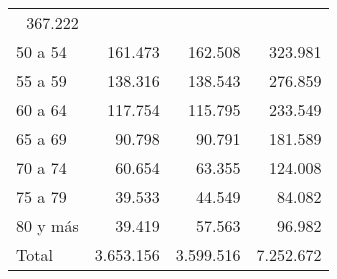 \begin{tabular}{llll}
  \multicolumn{1}{r}{367.222} \\
\multicolumn{1}{l}{\hspace{1em}50 a 54} &
  \multicolumn{1}{|r}{161.473} &
  \multicolumn{1}{r}{162.508} &
  \multicolumn{1}{r}{323.981} \\
\multicolumn{1}{l}{\hspace{1em}55 a 59} &
  \multicolumn{1}{|r}{138.316} &
  \multicolumn{1}{r}{138.543} &
  \multicolumn{1}{r}{276.859} \\
\multicolumn{1}{l}{\hspace{1em}60 a 64} &
  \multicolumn{1}{|r}{117.754} &
  \multicolumn{1}{r}{115.795} &
  \multicolumn{1}{r}{233.549} \\
\multicolumn{1}{l}{\hspace{1em}65 a 69} &
  \multicolumn{1}{|r}{90.798} &
  \multicolumn{1}{r}{90.791} &
  \multicolumn{1}{r}{181.589} \\
\multicolumn{1}{l}{\hspace{1em}70 a 74} &
  \multicolumn{1}{|r}{60.654} &
  \multicolumn{1}{r}{63.355} &
  \multicolumn{1}{r}{124.008} \\
\multicolumn{1}{l}{\hspace{1em}75 a 79} &
  \multicolumn{1}{|r}{39.533} &
  \multicolumn{1}{r}{44.549} &
  \multicolumn{1}{r}{84.082} \\
\multicolumn{1}{l}{\hspace{1em}80 y más} &
  \multicolumn{1}{|r}{39.419} &
  \multicolumn{1}{r}{57.563} &
  \multicolumn{1}{r}{96.982} \\
\multicolumn{1}{l}{\hspace{1em}Total} &
  \multicolumn{1}{|r}{3.653.156} &
  \multicolumn{1}{r}{3.599.516} &
  \multicolumn{1}{r}{7.252.672} \\
\cline{1-4}
\end{tabular}
